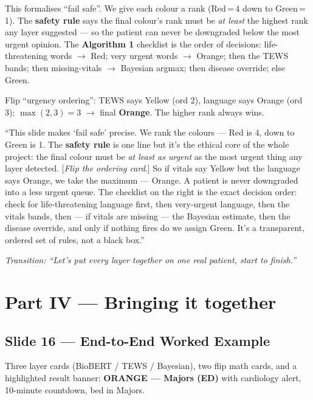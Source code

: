 \documentclass[11pt]{article}
\newcommand{\chip}[2]{\textcolor{#1}{\textbf{#2}}}
\newcommand{\transition}[1]{\medskip\noindent\textit{\textcolor{mutel}{Transition: #1}}\medskip}
\newcommand{\route}[1]{{\small\texttt{\textcolor{mutel}{#1}}}}
\newcommand{\slide}[3]{%
  \subsection{Slide #1 --- #2}%
  \noindent\route{Route: #3}\par\smallskip}
\begin{document}
\begin{idea}
This formalises ``fail safe''. We give each colour a rank (Red\,=\,4 down to Green\,=\,1). The
\textbf{safety rule} says the final colour's rank must be \emph{at least} the highest rank any layer
suggested --- so the patient can never be downgraded below the most urgent opinion. The
\textbf{Algorithm 1} checklist is the order of decisions: life-threatening words $\rightarrow$ Red; very
urgent words $\rightarrow$ Orange; then the TEWS bands; then missing-vitals $\rightarrow$ Bayesian argmax;
then disease override; else Green.
\end{idea}

\begin{demo}
Flip ``urgency ordering'': TEWS says Yellow (ord 2), language says Orange (ord 3); $\max(2,3)=3$
$\rightarrow$ final \chip{satOrange}{Orange}. The higher rank always wins.
\end{demo}

\begin{saybox}
``This slide makes `fail safe' precise. We rank the colours --- Red is 4, down to Green is 1. The
\textbf{safety rule} is one line but it's the ethical core of the whole project: the final colour must be
\emph{at least as urgent} as the most urgent thing any layer detected. [\emph{Flip the ordering card}.] So
if vitals say Yellow but the language says Orange, we take the maximum --- Orange. A patient is never
downgraded into a less urgent queue. The checklist on the right is the exact decision order: check for
life-threatening language first, then very-urgent language, then the vitals bands, then --- if vitals are
missing --- the Bayesian estimate, then the disease override, and only if nothing fires do we assign
Green. It's a transparent, ordered set of rules, not a black box.''
\end{saybox}

\transition{``Let's put every layer together on one real patient, start to finish.''}

\section{Part IV --- Bringing it together}

\slide{16}{End-to-End Worked Example}{/dashboard/math/worked-example}

\begin{onscreen}
Three layer cards (BioBERT / TEWS / Bayesian), two flip math cards, and a highlighted result banner:
\chip{satOrange}{ORANGE --- Majors (ED)} with cardiology alert, 10-minute countdown, bed in Majors.
\end{onscreen}
\end{document}
